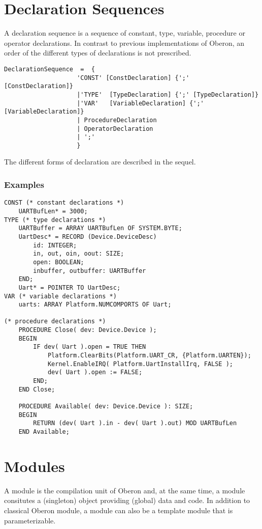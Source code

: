 \documentclass[a4wide,11pt]{article}
\begin{document}
\section{Declaration Sequences}

A declaration sequence is a sequence of constant, type, variable, procedure or operator declarations.
In contrast to previous implementations of Oberon, an order of the different types of declarations is not prescribed.

\begin{lstlisting}[style=ebnf]
DeclarationSequence  =  {
					'CONST' [ConstDeclaration] {';' [ConstDeclaration]}
					|'TYPE'  [TypeDeclaration] {';' [TypeDeclaration]}
					|'VAR'   [VariableDeclaration] {';' [VariableDeclaration]}
					| ProcedureDeclaration
					| OperatorDeclaration
					| ';'
					}
\end{lstlisting}

The different forms of declaration are described in the sequel.

\begin{annotation}
\subsubsection{Examples}
\begin{lstlisting}[style=example,caption=Example of a declaration sequence]
CONST (* constant declarations *)
	UARTBufLen* = 3000;
TYPE (* type declarations *)
	UARTBuffer = ARRAY UARTBufLen OF SYSTEM.BYTE;
	UartDesc* = RECORD (Device.DeviceDesc)
		id: INTEGER;
		in, out, oin, oout: SIZE;
		open: BOOLEAN;
		inbuffer, outbuffer: UARTBuffer
	END;
	Uart* = POINTER TO UartDesc;
VAR (* variable declarations *)
	uarts: ARRAY Platform.NUMCOMPORTS OF Uart;

(* procedure declarations *)
	PROCEDURE Close( dev: Device.Device );
	BEGIN
		IF dev( Uart ).open = TRUE THEN
			Platform.ClearBits(Platform.UART_CR, {Platform.UARTEN});
			Kernel.EnableIRQ( Platform.UartInstallIrq, FALSE );
			dev( Uart ).open := FALSE;
		END;
	END Close;

	PROCEDURE Available( dev: Device.Device ): SIZE;
	BEGIN
		RETURN (dev( Uart ).in - dev( Uart ).out) MOD UARTBufLen
	END Available;
\end{lstlisting}
\end{annotation}

\section{Modules}
A module is the compilation unit of Oberon and, at the same time, a module consitutes a (singleton) object providing (global) data and code.
In addition to classical Oberon module, a module can also be a template module that is parameterizable.
\end{document}
